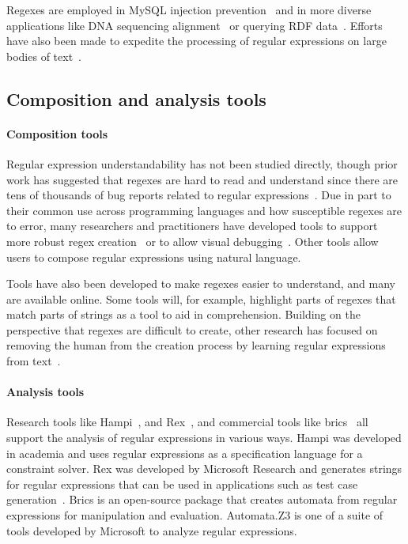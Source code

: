 Regexes are employed in MySQL injection prevention~\cite{Yeole:2011:ADT:1980022.1980229} and in more diverse applications like DNA sequencing alignment~\cite{1594922} or querying RDF data~\cite{Lee:2010:PSQ:1871871.1871877, Alkhateeb:2009:ESR:1540656.1540975}.  Efforts have also been made to expedite the processing of regular expressions on large bodies of text~\cite{Baeza-Yates:1996:FTS:235809.235810}.

\subsection{Composition and analysis tools}
\paragraph{Composition tools} Regular expression understandability has not been studied directly, though prior work has suggested that regexes are hard to read and understand since there are tens of thousands of bug reports related to regular expressions~\cite{Spishak:2012:TSR:2318202.2318207}.  Due in part to their common use across programming languages and how susceptible regexes are to error, many researchers and practitioners have developed tools to support more robust regex creation~\cite{Spishak:2012:TSR:2318202.2318207} or to allow visual debugging~\cite{Beck:2014:RVD:2591062.2591111}.  Other tools allow users to compose regular expressions using natural language.

Tools have also been developed to make regexes easier to understand, and many are available online. Some tools will, for example, highlight parts of regexes that match parts of strings as a tool to aid in comprehension.  Building on the perspective that regexes are difficult to create, other research has focused on removing the human from the creation process by learning regular expressions from  text~\cite{Babbar:2010:CBA:1871840.1871848, Li:2008:REL:1613715.1613719}.

\paragraph{Analysis tools} Research tools like Hampi~\cite{hampi}, and Rex~\cite{rex}, and commercial tools like brics~\cite{brics} all support the analysis of regular expressions in various ways. Hampi was developed  in academia and uses regular expressions as a specification language for a constraint solver. Rex was developed by Microsoft Research and generates strings for regular expressions that can be used in  applications such as test case generation~\cite{Anand:2013:OSM:2503903.2503991, Tillmann:2014:TAT:2642937.2642941}. Brics is an open-source package that creates automata from regular expressions for manipulation and evaluation. Automata.Z3 is one of a suite of tools developed by Microsoft to analyze regular expressions.
